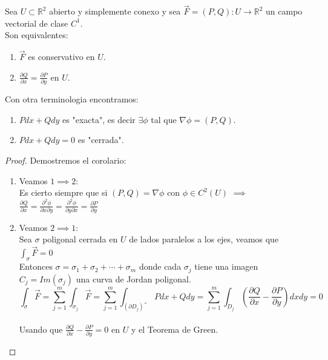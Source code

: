 
\begin{corolario}
    Sea $U \subset \mathbb{R}^2$ abierto y simplemente conexo y sea $\vec{F} = (P, Q): U \to \mathbb{R}^2$ un campo vectorial de clase $C^1$.\\
    Son equivalentes:\\
    \begin{enumerate}
        \item $\vec{F}$ es conservativo en $U$.
        \item $\frac{\partial Q}{\partial x} = \frac{\partial P}{\partial y}$ en $U$.
    \end{enumerate}
    Con otra terminologia encontramos:
    \begin{enumerate}
        \item $Pdx + Qdy$ es "exacta", es decir $\exists \phi$ tal que $\nabla \phi = (P,Q)$.
        \item $Pdx + Qdy = 0$ es "cerrada".
    \end{enumerate}
\end{corolario}

\begin{proof}
    Demostremos el corolario:\\
    \begin{enumerate}
        \item Veamos $1 \implies 2$:\\
        Es cierto siempre que si $(P,Q) = \nabla \phi$ con $\phi \in C^2(U)$ $\implies$ $\frac{\partial Q}{\partial x} = \frac{\partial^2 \phi}{\partial x \partial y} = \frac{\partial^2 \phi}{\partial y \partial x} = \frac{\partial P}{\partial y}$\\
        \item Veamos $2 \implies 1$:\\
        Sea $\sigma$ poligonal cerrada en $U$ de lados paralelos a los ejes, veamos que $\int_{\sigma} \vec{F} = 0$\\
        Entonces $\sigma = \sigma_1 + \sigma_2 + \cdots + \sigma_m$ donde cada $\sigma_j$ tiene una imagen $C_j = Im(\sigma_j)$ una curva de Jordan poligonal.\\
        $$\int_{\sigma} \vec{F} = \sum_{j=1}^{m} \int_{\sigma_j} \vec{F} = \sum_{j=1}^{m} \int_{\left(\partial D_j \right)^+} Pdx + Qdy = \sum_{j=1}^{m} \int_{D_j} \left( \frac{\partial Q}{\partial x} - \frac{\partial P}{\partial y} \right) dxdy = 0$$ \\
        Usando que $\frac{\partial Q}{\partial x} - \frac{\partial P}{\partial y} = 0$ en $U$ y el Teorema de Green.\\
    \end{enumerate}
\end{proof}

